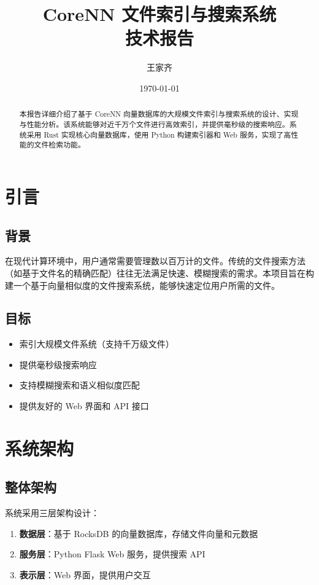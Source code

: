 \documentclass[12pt,a4paper]{article}
\title{\textbf{CoreNN 文件索引与搜索系统\\技术报告}}
\author{王家齐}
\date{\today}
\begin{document}
\maketitle

\begin{abstract}
本报告详细介绍了基于 CoreNN 向量数据库的大规模文件索引与搜索系统的设计、实现与性能分析。该系统能够对近千万个文件进行高效索引，并提供毫秒级的搜索响应。系统采用 Rust 实现核心向量数据库，使用 Python 构建索引器和 Web 服务，实现了高性能的文件检索功能。
\end{abstract}

\tableofcontents
\newpage

\section{引言}

\subsection{背景}
在现代计算环境中，用户通常需要管理数以百万计的文件。传统的文件搜索方法（如基于文件名的精确匹配）往往无法满足快速、模糊搜索的需求。本项目旨在构建一个基于向量相似度的文件搜索系统，能够快速定位用户所需的文件。

\subsection{目标}
\begin{itemize}
    \item 索引大规模文件系统（支持千万级文件）
    \item 提供毫秒级搜索响应
    \item 支持模糊搜索和语义相似度匹配
    \item 提供友好的 Web 界面和 API 接口
\end{itemize}

\section{系统架构}

\subsection{整体架构}
系统采用三层架构设计：

\begin{enumerate}
    \item \textbf{数据层}：基于 RocksDB 的向量数据库，存储文件向量和元数据
    \item \textbf{服务层}：Python Flask Web 服务，提供搜索 API
    \item \textbf{表示层}：Web 界面，提供用户交互
\end{enumerate}
\end{document}
